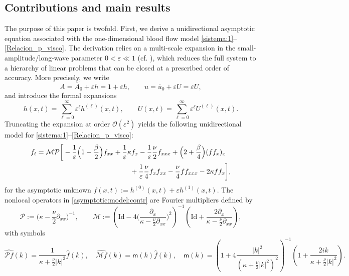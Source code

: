 \documentclass[reqno]{amsart}
\newcommand{\Id}{\mathrm{Id}}
\theoremstyle{definition}
\numberwithin{equation}{section}
\numberwithin{theorem}{section}
\numberwithin{definition}{section}
\begin{document}
\subsection{Contributions and main results}\label{subsec:contrib}

The purpose of this paper is twofold. First, we derive a unidirectional asymptotic equation associated with the
one-dimensional blood flow model \eqref{sistema:1}--\eqref{Relacion_p_visco}. The derivation relies on a multi-scale
expansion in the small-amplitude/long-wave parameter $0<\varepsilon\ll1$ (cf. \cite{AODGB24,AGBSW19,GBS21}),
which reduces the full system to a hierarchy of linear problems that can be closed at a prescribed order of accuracy.
More precisely, we write
\[
A=\overline A_0+\varepsilon h = 1+\varepsilon h,
\qquad
u=\overline u_0+\varepsilon U=\varepsilon U,
\]
and introduce the formal expansions
\[
h(x,t)=\sum_{\ell=0}^{\infty}\varepsilon^\ell h^{(\ell)}(x,t),
\qquad
U(x,t)=\sum_{\ell=0}^{\infty}\varepsilon^\ell U^{(\ell)}(x,t).
\]
Truncating the expansion at order $\mathcal O(\varepsilon^2)$ yields the following unidirectional model for
\eqref{sistema:1}--\eqref{Relacion_p_visco}:
\begin{align}\label{asymptotic:model:contr}
	f_{t}&=\mathcal{M}\mathcal{P}\bigg[ - \frac{1}{\varepsilon}\Big(1-\frac{\beta}{2}\Big)f_{xx}
	+ \frac{1}{\varepsilon}\kappa f_{x}
	- \frac{1}{\varepsilon}\frac{\nu}{2}f_{xxx}
	+ \Big(2+\frac{\beta}{4}\Big)(f f_{x})_{x}    \nonumber \\
	&\hspace{4.7cm}+ \frac{1}{\varepsilon}\frac{\nu}{4}f_{x}f_{xx}
	-\frac{\nu}{4}ff_{xxx}
	-2\kappa ff_{x}\bigg],
\end{align}
for the asymptotic unknown $f(x,t):=h^{(0)}(x,t)+\varepsilon h^{(1)}(x,t)$.
The nonlocal operators in \eqref{asymptotic:model:contr} are Fourier multipliers defined by
\begin{equation}\label{opP}
	\mathcal{P}:=\Big(\kappa-\frac{\nu}{2}\partial_{xx}\Big)^{-1},
	\qquad
	\mathcal{M}:=\left(\Id-4\Big(\frac{\partial_x}{\kappa-\frac{\nu}{2}\partial_{xx}}\Big)^{2}\right)^{-1}
	\left(\Id+\frac{2\partial_x}{\kappa-\frac{\nu}{2}\partial_{xx}}\right),
\end{equation}
with symbols
\begin{equation}\label{multiplierP-multiplierM}
	\widehat{\mathcal{P}f}(k)=\frac{1}{\kappa+\frac{\nu}{2}|k|^{2}}\widehat{f}(k),
	\quad
	\widehat{\mathcal{M}f}(k)= \mathsf{m}(k)\widehat{f}(k),
	\quad
	\mathsf{m}(k)=\left(1 + 4 \frac{|k|^2}{\left(\kappa + \frac{\nu}{2} |k|^2\right)^2} \right)^{-1}
	\left(1 +  \frac{2 i k}{\kappa + \frac{\nu}{2} |k|^2}\right).
\end{equation}
\end{document}
